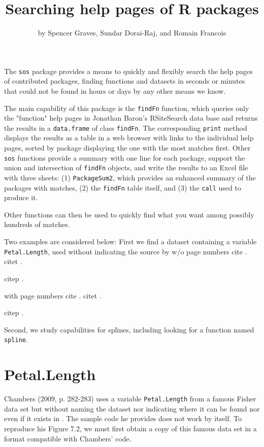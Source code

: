 \title{Searching help pages of R packages}
\author{by Spencer Graves, Sundar Dorai-Raj, and Romain Francois}

\maketitle

The {\tt sos} package provides a means to quickly and
flexibly search the help pages of contributed packages, finding
functions and datasets in seconds or minutes that could not be
found in hours or days by any other means we know.

The main capability of this package is the {\tt findFn} function,
which queries only the "function" help pages in Jonathan Baron's
RSiteSearch data base and returns the results in a {\tt data.frame}
of class {\tt findFn}.  The corresponding {\tt print} method
displays the results as a table in a web browser with links to the
individual help pages, sorted by package displaying the one with the
most matches first.  Other {\tt sos} functions provide a summary
with one line for each package, support the union and intersection
of {\tt findFn} objects, and write the results to an Excel file
with three sheets:  (1) {\tt PackageSum2}, which
provides an enhanced summary of the packages with matches, (2) the
{\tt findFn} table itself, and (3) the {\tt call} used to produce it.

Other \R{} functions can then be used to quickly find what you want
among possibly hundreds of matches.

Two examples are considered below:  First we find a dataset containing
a variable {\tt Petal.Length}, used without indicating the source
by 
w/o page numbers 
cite \cite{JC09}.
citet \citet{JC09}.

citep \citep{JC09}.

with page numbers
cite \cite[pp. 282-283]{JC09}.
citet \citet[pp. 282-283]{JC09}.

citep \citep[pp. 282-283]{JC09}.

Second, we study \R{} capabilities
for splines, including looking for a function named {\tt spline}.

\section*{Petal.Length}

Chambers (2009, p. 282-283) uses a variable {\tt Petal.Length} from a
famous Fisher data set but without naming the dataset nor indicating
where it can be found nor even if it exists in \R{}.  The sample
code he provides does not work by itself.  To reproduce his
Figure 7.2, we must first obtain a copy of this famous data set
in a format compatible with Chambers' code.

